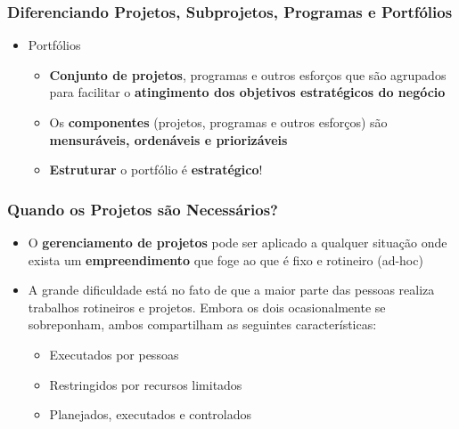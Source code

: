 \begin{frame}
 \frametitle{Diferenciando Projetos, Subprojetos, Programas e Portfólios}
 \begin{itemize}
  \item Portfólios
   \begin{itemize}
    \item \textbf{Conjunto de projetos}, programas e outros esforços que são agrupados para facilitar o \textbf{atingimento dos 
    objetivos estratégicos do negócio} 
    \item Os \textbf{componentes} (projetos, programas e outros esforços) são \textbf{mensuráveis, ordenáveis e priorizáveis}
    \item \textbf{Estruturar} o portfólio é \textbf{estratégico}!
   \end{itemize}
 \end{itemize}
\end{frame}

\begin{frame}
 \frametitle{Quando os Projetos são Necessários?}
 \begin{itemize}
  \item O \textbf{gerenciamento de projetos} pode ser aplicado a qualquer situação onde exista um \textbf{empreendimento} 
  que foge ao que é fixo e rotineiro (ad-hoc)
  \item A grande dificuldade está no fato de que a maior parte das pessoas realiza trabalhos rotineiros e projetos.
  Embora os dois ocasionalmente se sobreponham, ambos compartilham as seguintes características:
  \begin{itemize}
   \item Executados por pessoas
   \item Restringidos por recursos limitados
   \item Planejados, executados e controlados
  \end{itemize}
 \end{itemize}
\end{frame}




